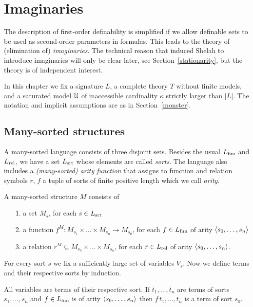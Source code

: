 \chapter{Imaginaries}
\label{imaginary}


\def\vl{\mr}

The description of first-order definability is simplified if we allow definable sets to be used as second-order parameters in formulas.
This leads to the theory of (elimination of) \textit{imaginaries}.
The technical reason that induced Shelah to introduce imaginaries will only be clear later, see Section~\ref{stationarity}, but the theory is of independent interest.

In this chapter we fix a signature $L$, a complete theory $T$ without finite models, and a saturated model $\EuScript U$ of inaccessible cardinality $\kappa$ strictly larger than $|L|$.
The notation and implicit assumptions are as in Section~\ref{monster}.

\section{Many-sorted structures}
\label{many-sorted}
\def\Ar{{\rm Ar}}

A many-sorted language consists of three disjoint sets.
Besides the usual $L_{\rm fun}$ and $L_{\rm rel}$, we have a set $L_{\rm srt}$  whose elements are called \emph{sorts}.
The language also includes a \emph{(many-sorted) arity function} that assigns to function and relation symbols $r$, $f$ a tuple of sorts of finite positive length which we call \emph{arity}.

A many-sorted structure $M$ consists of
\begin{itemize}
\item[1.] a set $M_s$, for each $s\in L_{\rm srt}$
\item[2.] a function $f^M:M_{s_1}\times\dots\times M_{s_n}\to M_{s_0}$, for each $f\in L_{\rm fun}$ of arity $\langle s_0,\dots,s_n\rangle$
\item[3.] a relation $r^M\subseteq M_{s_0}\times\dots\times M_{s_n}$, for each $r\in L_{\rm rel}$ of arity $\langle s_0,\dots,s_n\rangle$.
\end{itemize}

For every sort $s$ we fix a sufficiently large set of variables $V_s$.
Now we define terms and their respective sorts by induction.

All variables are terms of their respective sort.
If $t_1,\dots,t_n$ are terms of sorts $s_1,\dots,s_n$ and $f\in L_{\rm fun}$ is of arity $\langle s_0,\dots,s_n\rangle$ then $f\,t_1,\dots,t_n$ is a term of sort $s_0$.


